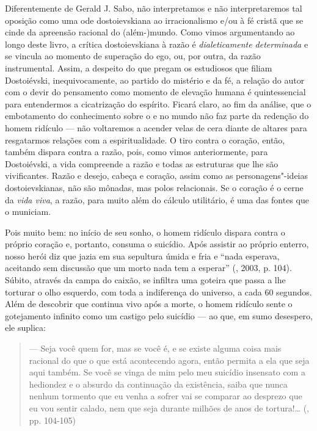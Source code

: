 Diferentemente de Gerald J. Sabo, não interpretamos e não
interpretaremos tal oposição como uma ode dostoievskiana ao
irracionalismo e/ou à fé cristã que se cinde da apreensão racional do
\mbox{(além-)mundo}. Como vimos argumentando ao longo deste livro, a crítica
dostoievskiana à razão é \emph{dialeticamente determinada} e se vincula
ao momento de superação do ego, ou, por outra, da razão instrumental.
Assim, a despeito do que pregam os estudiosos que filiam Dostoiévski,
inequivocamente, ao partido do mistério e da fé, a relação do autor com
o devir do pensamento como momento de elevação humana é quintessencial
para entendermos a cicatrização do espírito. Ficará claro, ao fim da
análise, que o embotamento do conhecimento sobre o e no mundo não faz
parte da redenção do homem ridículo --- não voltaremos a acender velas de
cera diante de altares para resgatarmos relações com a espiritualidade.
O tiro contra o coração, então, também dispara contra a razão, pois,
como vimos anteriormente, para Dostoiévski, a vida compreende a razão e
todas as estruturas que lhe são vivificantes. Razão e desejo, cabeça e
coração, assim como as personagens"-ideias dostoievskianas, não são
mônadas, mas polos relacionais. Se o coração é o cerne da \emph{vida
viva}, a razão, para muito além do cálculo utilitário, é uma das fontes
que o municiam.

Pois muito bem: no início de seu sonho, o homem ridículo dispara contra
o próprio coração e, portanto, consuma o suicídio. Após assistir ao
próprio enterro, nosso herói diz que jazia em sua sepultura úmida e fria
e ``nada esperava, aceitando sem discussão que um morto nada tem a
esperar'' (, 2003, p. 104). Súbito, através da campa do
caixão, se infiltra uma goteira que passa a lhe torturar o olho
esquerdo, com toda a indiferença do universo, a cada 60 segundos. Além
de descobrir que continua vivo após a morte, o homem ridículo sente o
gotejamento infinito como um castigo pelo suicídio --- ao que, em sumo
desespero, ele suplica:

\begin{quote}
--- Seja você quem for, mas se você é, e se existe alguma coisa mais
racional do que o que está acontecendo agora, então permita a ela que
seja aqui também. Se você se vinga de mim pelo meu suicídio insensato
com a hediondez e o absurdo da continuação da existência, saiba que
nunca nenhum tormento que eu venha a sofrer vai se comparar ao desprezo
que eu vou sentir calado, nem que seja durante milhões de anos de
tortura!\ldots{} (, pp. 104-105)
\end{quote}

